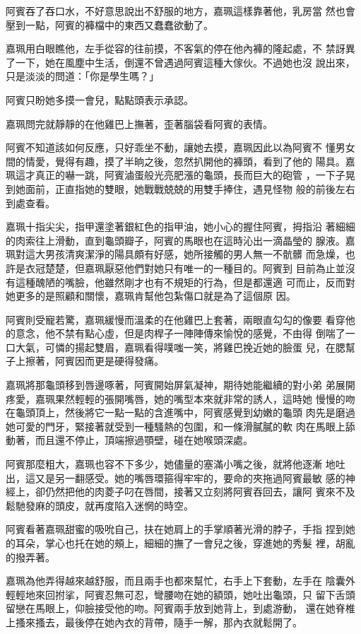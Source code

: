 阿賓吞了吞口水，不好意思說出不舒服的地方，嘉珮這樣靠著他，乳房當
然也會壓到一點，阿賓的褲檔中的東西又蠢蠢欲動了。

嘉珮用白眼瞧他，左手從容的往前摸，不客氣的停在他內褲的隆起處，不
禁訝異了一下，她在風塵中生活，倒還不曾遇過阿賓這種大傢伙。不過她也沒
說出來，只是淡淡的問道：「你是學生嗎？」

阿賓只盼她多摸一會兒，點點頭表示承認。

嘉珮問完就靜靜的在他雞巴上撫著，歪著腦袋看阿賓的表情。

阿賓不知道該如何反應，只好乖坐不動，讓她去摸，嘉珮因此以為阿賓不
懂男女間的情愛，覺得有趣，摸了半晌之後，忽然扒開他的褲頭，看到了他的
陽具。嘉珮這才真正的嚇一跳，阿賓滷蛋般光亮肥漲的龜頭，長而巨大的砲管
，一下子晃到她面前，正直指她的雙眼，她戰戰兢兢的用雙手捧住，遇見怪物
般的前後左右到處查看。

嘉珮十指尖尖，指甲還塗著銀紅色的指甲油，她小心的握住阿賓，拇指沿
著細細的肉索往上滑動，直到龜頭瓣子，阿賓的馬眼也在這時沁出一滴晶瑩的
腺液。嘉珮對這大男孩清爽潔淨的陽具頗有好感，她所接觸的男人無一不骯髒
而急燥，也許是衣冠楚楚，但嘉珮厭惡他們對她只有唯一的一種目的。阿賓到
目前為止並沒有這種醜陋的嘴臉，他雖然剛才也有不規矩的行為，但是都還適
可而止，反而對她更多的是照顧和關懷，嘉珮肯幫他包紮傷口就是為了這個原
因。

阿賓則受寵若驚，嘉珮緩慢而溫柔的在他雞巴上套著，兩眼直勾勾的像要
看穿他的意念，他不禁有點心虛，但是肉桿子一陣陣傳來愉悅的感覺，不由得
倒喘了一口大氣，可憐的揚起雙眉，嘉珮看得噗嗤一笑，將雞巴挽近她的臉蛋
兒，在腮幫子上擦著，阿賓因而更是硬得發痛。

嘉珮將那龜頭移到唇邊啄著，阿賓開始屏氣凝神，期待她能繼續的對小弟
弟展開疼愛，嘉珮果然輕輕的張開嘴唇，她的嘴型本來就非常的誘人，這時她
慢慢的吻在龜頭頂上，然後將它一點一點的含進嘴中，阿賓感覺到幼嫩的龜頭
肉先是磨過她可愛的門牙，緊接著就受到一種騷熱的包圍，和一條滑膩膩的軟
肉在馬眼上舔動著，而且還不停止，頂端擦過顎壁，碰在她喉頭深處。

阿賓那麼粗大，嘉珮也容不下多少，她儘量的塞滿小嘴之後，就將他逐漸
地吐出，這又是另一翻感受。她的嘴唇環箍得牢牢的，要命的夾拖過阿賓最敏
感的神經上，卻仍然把他的肉菱子叼在唇間，接著又立刻將阿賓吞回去，讓阿
賓來不及鬆馳發麻的頭皮，就再度陷入迷惘的時空。

阿賓看著嘉珮甜蜜的吸吮自己，扶在她肩上的手掌順著光滑的脖子，手指
捏到她的耳朵，掌心也托在她的頰上，細細的撫了一會兒之後，穿進她的秀髮
裡，胡亂的撥弄著。

嘉珮為他弄得越來越舒服，而且兩手也都來幫忙，右手上下套動，左手在
陰囊外輕輕地來回拊挲，阿賓忍無可忍，彎腰吻在她的額頭，她吐出龜頭，只
留下舌頭留戀在馬眼上，仰臉接受他的吻。阿賓兩手放到她背上，到處游動，
還在她脊椎上搔來搔去，最後停在她內衣的背帶，隨手一解，那內衣就鬆開了。

